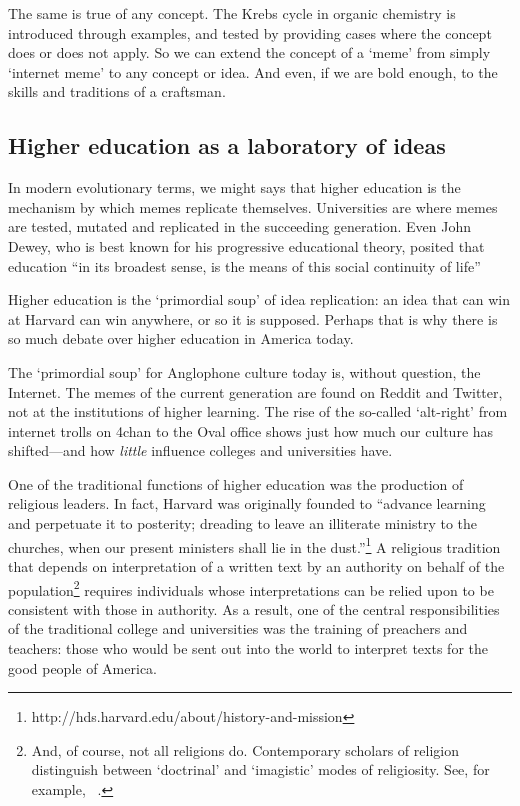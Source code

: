 The same is true of any concept. The Krebs cycle in organic chemistry is introduced through examples, and tested by providing cases where the concept does or does not apply. So we can extend the concept of a `meme' from simply `internet meme' to any concept or idea. And even, if we are bold enough, to the skills and traditions of a craftsman.

\subsection{Higher education as a laboratory of ideas}
\label{highereducationasalaboratoryofideas}

In modern evolutionary terms, we might says that higher education is the mechanism by which memes replicate themselves. Universities are where memes are tested, mutated and replicated in the succeeding generation. Even John Dewey, who is best known for his progressive educational theory, posited that education ``in its broadest sense, is the means of this social continuity of life'' ~\citep[p. 3]{Dewey:1916tl}

Higher education is the `primordial soup' of idea replication: an idea that can win at Harvard can win anywhere, or so it is supposed. Perhaps that is why there is so much debate over higher education in America today.

The `primordial soup' for Anglophone culture today is, without question, the Internet. The memes of the current generation are found on Reddit and Twitter, not at the institutions of higher learning. The rise of the so-called `alt-right' from internet trolls on 4chan to the Oval office shows just how much our culture has shifted---and how \emph{little} influence colleges and universities have.

One of the traditional functions of higher education was the production of religious leaders. In fact, Harvard was originally founded to ``advance learning and perpetuate it to posterity; dreading to leave an illiterate ministry to the churches, when our present ministers shall lie in the dust.''\footnote{http:\slash \slash hds.harvard.edu\slash about\slash history-and-mission} A religious tradition that depends on interpretation of a written text by an authority on behalf of the population\footnote{And, of course, not all religions do. Contemporary scholars of religion distinguish between `doctrinal' and `imagistic' modes of religiosity. See, for example, ~\citep{Whitehouse:2002uh}.} requires individuals whose interpretations can be relied upon to be consistent with those in authority. As a result, one of the central responsibilities of the traditional college and universities was the training of preachers and teachers: those who would be sent out into the world to interpret texts for the good people of America. 

